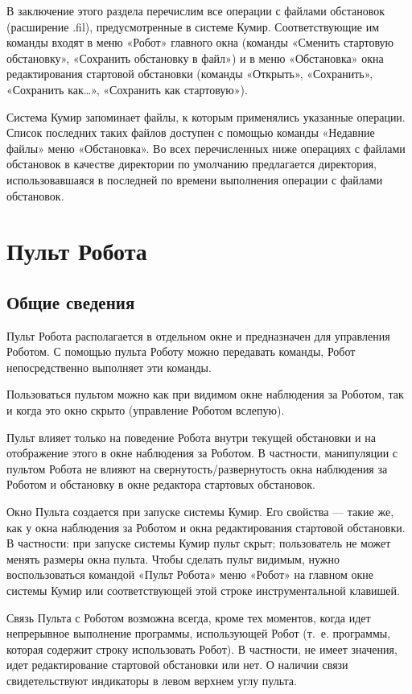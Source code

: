 \documentclass[12pt,a4paper]{article}
\begin{document}
В заключение этого раздела перечислим все операции с файлами обстановок (расширение .fil), предусмотренные в системе Кумир. Соответствующие им команды входят в меню «Робот» главного окна (команды «Сменить стартовую обстановку», «Сохранить обстановку в файл») и в меню «Обстановка» окна редактирования стартовой обстановки (команды «Открыть», «Сохранить»,  «Сохранить как\dots», «Сохранить как стартовую»).

Система Кумир запоминает файлы, к которым применялись указанные операции. Список последних таких файлов доступен с помощью команды «Недавние файлы» меню «Обстановка». Во всех перечисленных ниже операциях с файлами обстановок в качестве директории по умолчанию предлагается директория, использовавшаяся в последней по времени выполнения операции с файлами обстановок.

\section{Пульт Робота}
\label{robotpult}

\subsection{Общие сведения}

Пульт Робота располагается в отдельном окне и предназначен для управления Роботом. С помощью пульта Роботу можно передавать команды, Робот непосредственно выполняет эти команды. 

Пользоваться пультом можно как при видимом окне наблюдения за Роботом, так и когда это окно скрыто (управление Роботом вслепую).

Пульт влияет только на поведение Робота внутри текущей обстановки и на отображение этого в окне наблюдения за Роботом.  В частности, манипуляции с пультом Робота не влияют на свернутость/развернутость окна наблюдения за Роботом и обстановку в окне редактора стартовых обстановок.

Окно Пульта создается при запуске системы Кумир.  Его свойства --- такие же, как у окна наблюдения за Роботом  и окна редактирования стартовой обстановки.  В частности: при запуске системы Кумир пульт скрыт; пользователь не может менять размеры окна пульта. Чтобы сделать пульт видимым, нужно воспользоваться командой «Пульт Робота» меню «Робот» на главном окне системы Кумир или соответствующей этой строке инструментальной клавишей.

Связь Пульта с Роботом возможна всегда, кроме тех моментов, когда идет непрерывное выполнение программы, использующей Робот (т.~е. программы, которая содержит строку \textsf{использовать Робот}). В частности, не имеет значения, идет редактирование стартовой обстановки или нет. О наличии связи свидетельствуют индикаторы в левом верхнем углу пульта.
\end{document}

